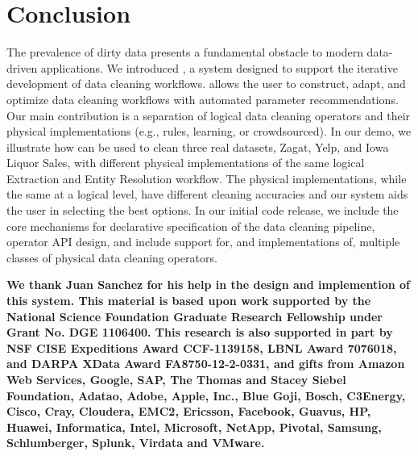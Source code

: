 \section{Conclusion}
The prevalence of dirty data presents a fundamental obstacle to modern data-driven applications.
We introduced \sys, a system designed to support the iterative development of data cleaning workflows.
\sys allows the user to construct, adapt, and optimize data cleaning workflows with automated parameter recommendations.
Our main contribution is a separation of logical data cleaning operators and their physical implementations (e.g., rules, learning, or crowdsourced).
In our demo, we illustrate how \sys can be used to clean three real datasets, Zagat, Yelp, and Iowa Liquor Sales, with different physical implementations of the same logical Extraction and Entity Resolution workflow.
The physical implementations, while the same at a logical level, have different cleaning accuracies and our system aids the user in selecting the best options.
In our initial code release, we include the core mechanisms for declarative specification of the data cleaning pipeline, operator API design, and include support for, and implementations of, multiple classes of physical data cleaning operators.

\vspace{0.5em}

\scriptsize\textbf{We thank Juan Sanchez for his help in the design and implemention of this system. This material is based upon work supported by the National Science Foundation Graduate Research Fellowship under Grant No. DGE 1106400. This research is also supported in part by NSF CISE Expeditions Award CCF-1139158, LBNL Award 7076018, and DARPA XData Award FA8750-12-2-0331, and gifts from Amazon Web Services, Google, SAP, The Thomas and Stacey Siebel Foundation, Adatao, Adobe, Apple, Inc., Blue Goji, Bosch, C3Energy, Cisco, Cray, Cloudera, EMC2, Ericsson, Facebook, Guavus, HP, Huawei, Informatica, Intel, Microsoft, NetApp, Pivotal, Samsung, Schlumberger, Splunk, Virdata and VMware.}